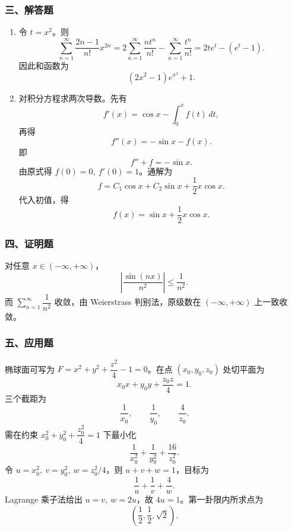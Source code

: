 \subsubsection*{三、解答题}
\begin{enumerate}
  \item 令 $t=x^2$。则
  \[
  \sum_{n=1}^{\infty}\frac{2n-1}{n!}x^{2n}
  =2\sum_{n=1}^{\infty}\frac{n t^n}{n!}-\sum_{n=1}^{\infty}\frac{t^n}{n!}
  =2te^t-(e^t-1).
  \]
  因此和函数为
  \[
  (2x^2-1)e^{x^2}+1.
  \]
  \item 对积分方程求两次导数。先有
  \[
  f'(x)=\cos x-\int_0^x f(t)\,dt,
  \]
  再得
  \[
  f''(x)=-\sin x-f(x).
  \]
  即
  \[
  f''+f=-\sin x.
  \]
  由原式得 $f(0)=0,\ f'(0)=1$。通解为
  \[
  f=C_1\cos x+C_2\sin x+\frac12 x\cos x.
  \]
  代入初值，得
  \[
  f(x)=\sin x+\frac12 x\cos x.
  \]
\end{enumerate}

\subsubsection*{四、证明题}
对任意 $x\in(-\infty,+\infty)$，
\[
\left|\frac{\sin(nx)}{n^2}\right|\le\frac1{n^2}.
\]
而 $\sum_{n=1}^{\infty}\dfrac1{n^2}$ 收敛，由 Weierstrass 判别法，原级数在 $(-\infty,+\infty)$ 上一致收敛。

\subsubsection*{五、应用题}
椭球面可写为 $F=x^2+y^2+\dfrac{z^2}{4}-1=0$。在点 $(x_0,y_0,z_0)$ 处切平面为
\[
x_0x+y_0y+\frac{z_0z}{4}=1.
\]
三个截距为
\[
\frac1{x_0},\qquad \frac1{y_0},\qquad \frac4{z_0}.
\]
需在约束 $x_0^2+y_0^2+\dfrac{z_0^2}{4}=1$ 下最小化
\[
\frac1{x_0^2}+\frac1{y_0^2}+\frac{16}{z_0^2}.
\]
令 $u=x_0^2,\ v=y_0^2,\ w=z_0^2/4$，则 $u+v+w=1$，目标为
\[
\frac1u+\frac1v+\frac4w.
\]
Lagrange 乘子法给出 $u=v,\ w=2u$，故 $4u=1$。第一卦限内所求点为
\[
\left(\frac12,\frac12,\sqrt2\right).
\]
